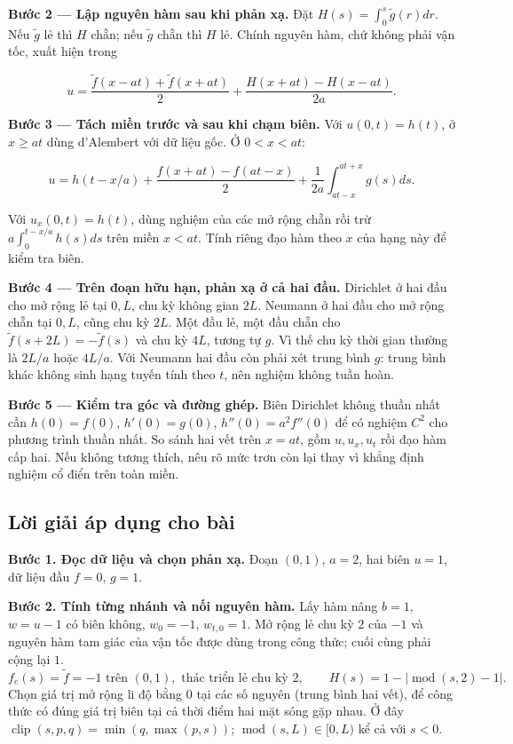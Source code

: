 \documentclass[10pt,a4paper]{article}
\begin{document}
\textbf{Bước 2 — Lập nguyên hàm sau khi phản xạ.} Đặt $H(s)=\int_0^s\widetilde g(r)dr$. Nếu $\widetilde g$ lẻ thì $H$ chẵn; nếu $\widetilde g$ chẵn thì $H$ lẻ. Chính nguyên hàm, chứ không phải vận tốc, xuất hiện trong


\[
u=\frac{\widetilde f(x-at)+\widetilde f(x+at)}2+\frac{H(x+at)-H(x-at)}{2a}.
\]


\textbf{Bước 3 — Tách miền trước và sau khi chạm biên.} Với $u(0,t)=h(t)$, ở $x\ge at$ dùng d'Alembert với dữ liệu gốc. Ở $0<x<at$:


\[
u=h(t-x/a)+\frac{f(x+at)-f(at-x)}2+\frac1{2a}\int_{at-x}^{at+x}g(s)ds.
\]


Với $u_x(0,t)=h(t)$, dùng nghiệm của các mở rộng chẵn rồi trừ $a\int_0^{t-x/a}h(s)ds$ trên miền $x<at$. Tính riêng đạo hàm theo $x$ của hạng này để kiểm tra biên.

\textbf{Bước 4 — Trên đoạn hữu hạn, phản xạ ở cả hai đầu.} Dirichlet ở hai đầu cho mở rộng lẻ tại $0,L$, chu kỳ không gian $2L$. Neumann ở hai đầu cho mở rộng chẵn tại $0,L$, cũng chu kỳ $2L$. Một đầu lẻ, một đầu chẵn cho $\widetilde f(s+2L)=-\widetilde f(s)$ và chu kỳ $4L$, tương tự $g$. Vì thế chu kỳ thời gian thường là $2L/a$ hoặc $4L/a$. Với Neumann hai đầu còn phải xét trung bình $g$: trung bình khác không sinh hạng tuyến tính theo $t$, nên nghiệm không tuần hoàn.

\textbf{Bước 5 — Kiểm tra góc và đường ghép.} Biên Dirichlet không thuần nhất cần $h(0)=f(0)$, $h'(0)=g(0)$, $h''(0)=a^2f''(0)$ để có nghiệm $C^2$ cho phương trình thuần nhất. So sánh hai vết trên $x=at$, gồm $u,u_x,u_t$ rồi đạo hàm cấp hai. Nếu không tương thích, nêu rõ mức trơn còn lại thay vì khẳng định nghiệm cổ điển trên toàn miền.
\subsection*{Lời giải áp dụng cho bài}
\textbf{Bước 1. Đọc dữ liệu và chọn phản xạ.} Đoạn $(0,1)$, $a=2$, hai biên $u=1$, dữ liệu đầu $f=0$, $g=1$.

\textbf{Bước 2. Tính từng nhánh và nối nguyên hàm.} Lấy hàm nâng $b=1$, $w=u-1$ có biên không, $w_0=-1$, $w_{t,0}=1$. Mở rộng lẻ chu kỳ $2$ của $-1$ và nguyên hàm tam giác của vận tốc được dùng trong công thức; cuối cùng phải cộng lại $1$.
\[f_e(s)=\widetilde f=-1\text{ trên }(0,1),\text{ thác triển lẻ chu kỳ }2,\qquad H(s)=1-|\operatorname{mod}(s,2)-1|.\]
Chọn giá trị mở rộng li độ bằng $0$ tại các số nguyên (trung bình hai vết), để công thức có đúng giá trị biên tại cả thời điểm hai mặt sóng gặp nhau.
Ở đây $\operatorname{clip}(s,p,q)=\min(q,\max(p,s))$; $\operatorname{mod}(s,L)\in[0,L)$ kể cả với $s<0$.
\end{document}
